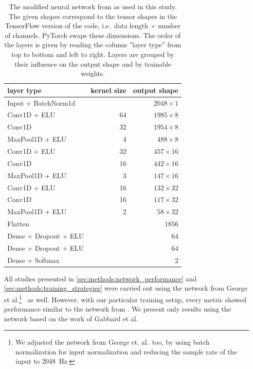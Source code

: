 \begin{table}[]
    \caption[Network architecture]{\label{tab:train_strat_network} The modified neural network from \cite{Gabbard:2017lja} as used in this study. The given shapes correspond to the tensor shapes in the TensorFlow version of the code, i.e.\ data length $\times$ number of channels. PyTorch swaps these dimensions. The order of the layers is given by reading the column ''layer type'' from top to bottom and left to right. Layers are grouped by their influence on the output shape and by trainable weights.
    }
    \centering
    \begin{tabular}{lrr}
    	\hline\hline
	    layer type & kernel size & output shape \\
	    \hline
	    Input + BatchNorm1d & & $2048\times 1$ \\
	    Conv1D + ELU & 64 & $1985\times 8$ \\
	    Conv1D & 32 & $1954\times 8$ \\
	    MaxPool1D + ELU & 4 & $488\times 8$ \\
	    Conv1D + ELU & 32 & $457\times 16$ \\
	    Conv1D & 16 & $442\times 16$ \\
	    MaxPool1D + ELU & 3 & $147\times 16$ \\
	    Conv1D + ELU & 16 & $132\times 32$ \\
	    Conv1D & 16 & $117\times 32$ \\
	    MaxPool1D + ELU & 2 & $58\times 32$ \\
	    Flatten & & $1856$ \\
	    Dense + Dropout + ELU & & $64$ \\
	    Dense + Dropout + ELU & & $64$ \\
	    Dense + Softmax & & $2$ \\
	    \hline\hline
	\end{tabular}
\end{table}


All studies presented in \autoref{sec:methods:network_performance} and \autoref{sec:methods:training_strategies} were carried out using the network from George et al.\footnote{We adjusted the network from George et. al.\ too, by using batch normalization for input normalization and reducing the sample rate of the input to \SI{2048}{\hertz}.}\ \cite{George:2016hay} as well. However, with our particular training setup, every metric showed performance similar to the network from \cite{Gabbard:2017lja}. We present only results using the network based on the work of Gabbard et al.

